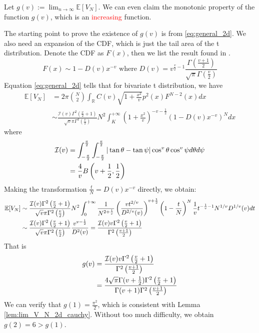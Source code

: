 \documentclass{article}
\def\E{\mathbb{E}}
\def\R{\mathbb{R}}
\begin{document}
Let $g(v):=\lim_{n \to \infty} \E[V_N]$. We can even claim the monotonic property
of the function $g(v)$, which is an \textcolor{red}{increasing}
function.

The starting point to prove the existence of $g(v)$ 
is from \eqref{eq:general_2d}.
We also need an expansion of the CDF, which is just the tail area
of the t distribution. Denote the CDF as $F(x)$, then we list the result found in \cite{andrew1976}.
\begin{equation}
    F(x) \sim 1 - D(v)x^{-v} \textrm{ where } D(v)
    =v^{\frac{v}{2}-1} \frac{\Gamma \left(\frac{v+1}{2} \right)}
    {\sqrt{\pi} \Gamma\left(\frac{v}{2}\right)}
\end{equation}
Equation \eqref{eq:general_2d} tells that for bivariate t distribution,
we have
\begin{align*}
    \E[V_N] & = 2\pi \binom{N}{2} \int_{\R}
    C(v) \sqrt{1+\frac{x^2}{v}} p^2(x)F^{N-2}(x)dx\\
    &\sim \frac{ \mathcal{I}(v)\Gamma^2 \left(\frac{v}{2} +1\right) }
    {\sqrt{v}\pi
    \Gamma^2\left(\frac{v}{2}\right)}  N^2
    \int_{K}^{+\infty} \left(1+\frac{x^2}{v}\right)^{-v-\frac{1}{2}}
    \left(1-D(v)x^{-v} \right)^N dx
\end{align*}
where
\begin{align}
    \mathcal{I}(v) &= \int_{-\frac{\pi}{2}}^{\frac{\pi}{2}}
    \int_{-\frac{\pi}{2}}^{\frac{\pi}{2}}
    |\tan \theta - \tan \psi|
    \cos^v\theta \cos^v \psi
    d\theta d\psi \notag\\
    &= \frac{4}{v} B\left(v+\frac{1}{2}, \frac{1}{2}
    \right)\label{eq:I_v_analytical}
\end{align}
Making the transformation $\frac{t}{N}=D(v)x^{-v}$
directly, we obtain:
\begin{align}\label{eq:EV_N_general}
    \E[V_N] &\sim
    \frac{ \mathcal{I}(v)
    \Gamma^2 \left(\frac{v}{2} +1\right) }
    {\sqrt{v}\pi
    \Gamma^2\left(\frac{v}{2}\right)}  N^2
    \int_{0}^{+\infty} \frac{1}{N^{2+\frac{1}{v}}}\left(\frac{vt^{2/v}}{D^{2/v}(v)}\right)^{v+\frac{1}{2}}
    \left(1- \frac{t}{N} \right)^N \frac{1}{v} t^{-\frac{1}{v}-1} N^{1/v} D^{1/v}(v)dt
    \\&\sim \frac{ \mathcal{I}(v)
    \Gamma^2 \left(\frac{v}{2} +1\right) }
    {\sqrt{v}\pi
    \Gamma^2\left(\frac{v}{2}\right)} \frac{v^{v-\frac{1}{2}}}
    {D^2(v)} = \frac{\mathcal{I}(v) v \Gamma^2\left(\frac{v}{2}+1\right)}
    {\Gamma^2 \left(\frac{v+1}{2} \right)} \notag
\end{align}
That is
\begin{align}
    g(v) &= \frac{\mathcal{I}(v) v \Gamma^2\left(\frac{v}{2}+1\right)}
    {\Gamma^2 \left(\frac{v+1}{2} \right)} \notag \\
    &= \frac{4\sqrt{\pi}
    \Gamma(v+\frac{1}{2})\Gamma^2\left(\frac{v}{2}+1\right)}
    {\Gamma(v+1)\Gamma^2 \left(\frac{v+1}{2} \right)}
\end{align}
We can verify that $g(1) = \frac{\pi^2}{2}$,
which is consistent with Lemma \ref{lem:lim_V_N_2d_cauchy}.
Without too much difficulty, we obtain $g(2)=6>g(1)$.
\end{document}

